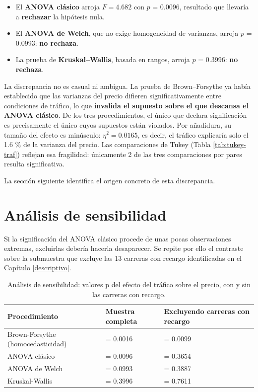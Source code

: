 \documentclass[
]{book}
\providecommand{\tightlist}{%
  \setlength{\itemsep}{0pt}\setlength{\parskip}{0pt}}
\begin{document}
\begin{itemize}
\tightlist
\item
  El \textbf{ANOVA clásico} arroja \(F = 4.682\) con \(p\)
  = 0.0096, resultado que llevaría a \textbf{rechazar} la hipótesis nula.
\item
  El \textbf{ANOVA de Welch}, que no exige homogeneidad de varianzas, arroja \(p\)
  = 0.0993: \textbf{no rechaza}.
\item
  La prueba de \textbf{Kruskal--Wallis}, basada en rangos, arroja \(p\) = 0.3996:
  \textbf{no rechaza}.
\end{itemize}

La discrepancia no es casual ni ambigua. La prueba de Brown--Forsythe ya había establecido que
las varianzas del precio difieren significativamente entre condiciones de tráfico, lo que
\textbf{invalida el supuesto sobre el que descansa el ANOVA clásico}. De los tres procedimientos,
el único que declara significación es precisamente el único cuyos supuestos están
violados. Por añadidura, su tamaño del efecto es minúsculo: \(\eta^2 = 0.0165\),
es decir, el tráfico explicaría solo el 1.6 \% de la varianza del precio.
Las comparaciones de Tukey (Tabla \ref{tab:tukey-traf}) reflejan esa fragilidad: únicamente
2 de las tres comparaciones por pares resulta significativa.

La sección siguiente identifica el origen concreto de esta discrepancia.

\section{Análisis de sensibilidad}\label{sensibilidad}

Si la significación del ANOVA clásico procede de unas pocas observaciones extremas, excluirlas
debería hacerla desaparecer. Se repite por ello el contraste sobre la submuestra que excluye
las 13 carreras con recargo identificadas en el Capítulo
\ref{descriptivo}.

\begin{table}

\caption{\label{tab:sensibilidad}Análisis de sensibilidad: valores p del efecto del tráfico sobre el precio, con y sin las carreras con recargo.}
\centering
\begin{tabular}[t]{l|l|l}
\hline
Procedimiento & Muestra completa & Excluyendo carreras con recargo\\
\hline
Brown-Forsythe (homocedasticidad) & = 0.0016 & = 0.0099\\
\hline
ANOVA clásico & = 0.0096 & = 0.3654\\
\hline
ANOVA de Welch & = 0.0993 & = 0.3887\\
\hline
Kruskal-Wallis & = 0.3996 & = 0.7611\\
\hline
\end{tabular}
\end{table}
\end{document}
